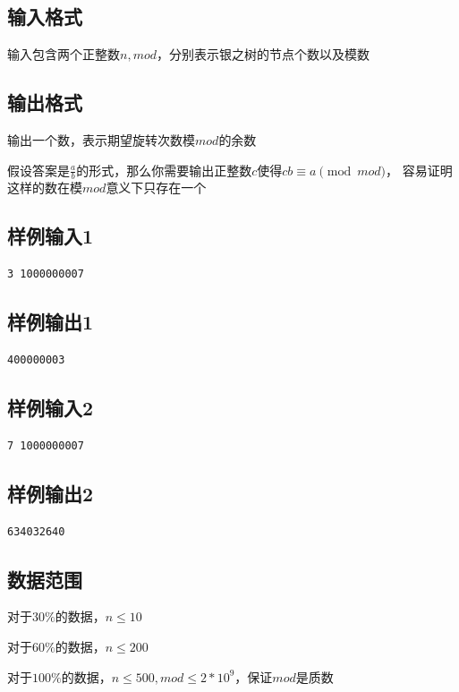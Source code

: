 \documentclass[12pt]{article}
\begin{document}
    \subsection{输入格式}
    输入包含两个正整数$n,mod$，分别表示银之树的节点个数以及模数
    \subsection{输出格式}
    输出一个数，表示期望旋转次数模$mod$的余数\par
    假设答案是$\frac{a}{b}$的形式，那么你需要输出正整数$c$使得$cb\equiv a\pmod {mod}$，
    容易证明这样的数在模$mod$意义下只存在一个
    \subsection{样例输入1}
    \lstset{language=C++}
    \begin{lstlisting}
3 1000000007
    \end{lstlisting}
    \subsection{样例输出1}
    \begin{lstlisting}
400000003 
    \end{lstlisting}
    \subsection{样例输入2}
    \begin{lstlisting}
7 1000000007
    \end{lstlisting}
    \subsection{样例输出2}
    \begin{lstlisting}
634032640
    \end{lstlisting}
    \subsection{数据范围}
    对于$30\%$的数据，$n\leq 10$\par
    对于$60\%$的数据，$n\leq 200$\par
    对于$100\%$的数据，$n\leq 500, mod\leq 2*10^9$，保证$mod$是质数
\end{document}

